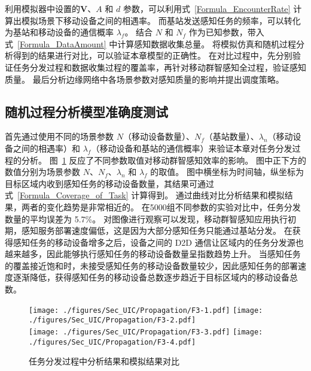 利用模拟器中设置的$\boldsymbol{V}$、$A$ 和 $d$ 参数，可以利用式~\eqref{Formula_EncounterRate} 计算出模拟场景下移动设备之间的相遇率。
而基站发送感知任务的频率，可以转化为基站和移动设备的通信概率 $\lambda_f$。
结合 $N$ 和 $N_f$ 作为已知参数，带入式~\eqref{Formula_DataAmount} 中计算感知数据收集总量。
将模拟仿真和随机过程分析得到的结果进行对比，可以验证本章模型的正确性。
在对比过程中，先分别验证任务分发过程和数据收集过程的覆盖率，再针对移动群智感知全过程，验证感知质量。
最后分析边缘网络中各场景参数对感知质量的影响并提出调度策略。


\subsection{随机过程分析模型准确度测试}

首先通过使用不同的场景参数 $N$（移动设备数量）、$N_f$（基站数量）、$\lambda_n$（移动设备之间的相遇率）和 $\lambda_f$（移动设备和基站的通信概率）来验证本章对任务分发过程的分析。
图~\ref{Figure_PropagationTest} 反应了不同参数取值对移动群智感知效率的影响。
图中正下方的数值分别为场景参数 $N$、$N_f$、$\lambda_n$ 和 $\lambda_f$ 的取值。
图中横坐标为时间轴，纵坐标为目标区域内收到感知任务的移动设备数量，其结果可通过式~\eqref{Formula_Coverage_of_Task} 计算得到。
通过曲线对比分析结果和模拟结果，两者的变化趋势是非常相近的。
在5000组不同参数的实验对比中，任务分发数量的平均误差为 5.7\%。
对图像进行观察可以发现，移动群智感知应用执行初期，感知服务部署速度偏低，这是因为大部分感知任务只能通过基站分发。
在获得感知任务的移动设备增多之后，设备之间的 D2D 通信让区域内的任务分发源也越来越多，因此能够执行感知任务的移动设备数量呈指数趋势上升。
当感知任务的覆盖接近饱和时，未接受感知任务的移动设备数量较少，因此感知任务的部署速度逐渐降低，获得感知任务的移动设备总数逐步趋近于目标区域内的移动设备总数。

\begin{figure}[!h]
  \centering
  {\texttt{[image: ./figures/Sec\_UIC/Propagation/F3-1.pdf]}}
  {\texttt{[image: ./figures/Sec\_UIC/Propagation/F3-2.pdf]}}\\
  {\texttt{[image: ./figures/Sec\_UIC/Propagation/F3-3.pdf]}}
  {\texttt{[image: ./figures/Sec\_UIC/Propagation/F3-4.pdf]}}
  \vspace{-0.5em}
  \caption{任务分发过程中分析结果和模拟结果对比}
  \vspace{-0.5em}
  \label{Figure_PropagationTest}
\end{figure}

